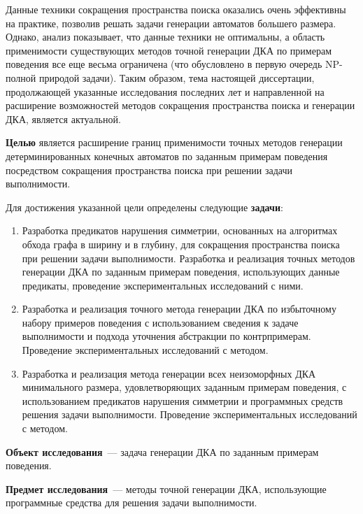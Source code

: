 Данные техники сокращения пространства поиска оказались очень эффективны на практике, позволив решать задачи генерации автоматов большего размера. Однако, анализ показывает, что данные техники не оптимальны, а область применимости существующих методов точной генерации ДКА по примерам поведения все еще весьма ограничена (что обусловлено в первую очередь NP-полной природой задачи). Таким образом, тема настоящей диссертации, продолжающей указанные исследования последних лет и направленной на расширение возможностей методов сокращения пространства поиска и генерации ДКА, является актуальной.



\textbf{Целью} является расширение границ применимости точных методов генерации детерминированных конечных автоматов по заданным примерам поведения посредством сокращения пространства поиска при решении задачи выполнимости.

Для достижения указанной цели определены следующие \textbf{задачи}:
\begin{enumerate}
  \item Разработка предикатов нарушения симметрии, основанных на алгоритмах обхода графа в ширину и в глубину, для сокращения пространства поиска при решении задачи выполнимости.
  Разработка и реализация точных методов генерации ДКА по заданным примерам поведения, использующих данные предикаты, проведение экспериментальных исследований с ними.

  \item Разработка и реализация точного метода генерации ДКА по избыточному набору примеров поведения с использованием сведения к задаче выполнимости и подхода уточнения абстракции по контрпримерам.
  Проведение экспериментальных исследований с методом.
  
  \item Разработка и реализация метода генерации всех неизоморфных ДКА минимального размера, удовлетворяющих заданным примерам поведения, с использованием предикатов нарушения симметрии и программных средств решения задачи выполнимости.
  Проведение экспериментальных исследований с методом.
\end{enumerate}

\textbf{Объект исследования}~{---} задача генерации ДКА по заданным примерам поведения.

\textbf{Предмет исследования}~{---} методы точной генерации ДКА, использующие программные средства для решения задачи выполнимости.

